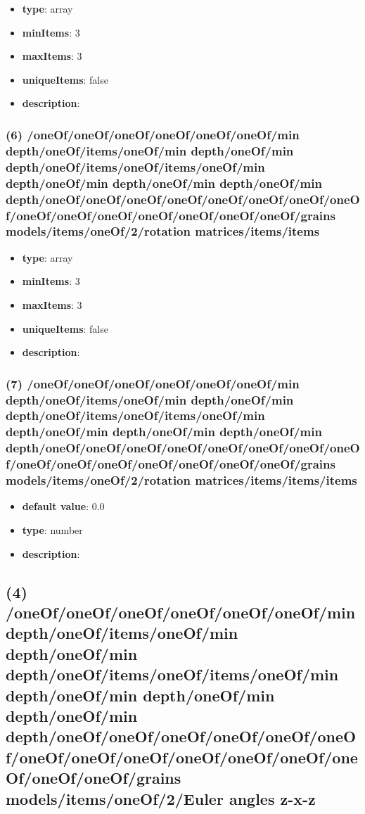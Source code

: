 \begin{itemize}[leftmargin=5em]\item {\bf type}: array
\item {\bf minItems}: 3
\item {\bf maxItems}: 3
\item {\bf uniqueItems}: false
\item {\bf description}: 
\end{itemize}\subsubsection{(6) /oneOf/oneOf/oneOf/oneOf/oneOf/oneOf/min depth/oneOf/items/oneOf/min depth/oneOf/min depth/oneOf/items/oneOf/items/oneOf/min depth/oneOf/min depth/oneOf/min depth/oneOf/min depth/oneOf/oneOf/oneOf/oneOf/oneOf/oneOf/oneOf/oneOf/oneOf/oneOf/oneOf/oneOf/oneOf/oneOf/oneOf/grains models/items/oneOf/2/rotation matrices/items/items}
\begin{itemize}[leftmargin=6em]\item {\bf type}: array
\item {\bf minItems}: 3
\item {\bf maxItems}: 3
\item {\bf uniqueItems}: false
\item {\bf description}: 
\end{itemize}\subsubsection{(7) /oneOf/oneOf/oneOf/oneOf/oneOf/oneOf/min depth/oneOf/items/oneOf/min depth/oneOf/min depth/oneOf/items/oneOf/items/oneOf/min depth/oneOf/min depth/oneOf/min depth/oneOf/min depth/oneOf/oneOf/oneOf/oneOf/oneOf/oneOf/oneOf/oneOf/oneOf/oneOf/oneOf/oneOf/oneOf/oneOf/oneOf/grains models/items/oneOf/2/rotation matrices/items/items/items}
\begin{itemize}[leftmargin=7em]\item {\bf default value}: 0.0
\item {\bf type}: number
\item {\bf description}: 
\end{itemize}\subsection{(4) /oneOf/oneOf/oneOf/oneOf/oneOf/oneOf/min depth/oneOf/items/oneOf/min depth/oneOf/min depth/oneOf/items/oneOf/items/oneOf/min depth/oneOf/min depth/oneOf/min depth/oneOf/min depth/oneOf/oneOf/oneOf/oneOf/oneOf/oneOf/oneOf/oneOf/oneOf/oneOf/oneOf/oneOf/oneOf/oneOf/oneOf/grains models/items/oneOf/2/Euler angles z-x-z}
